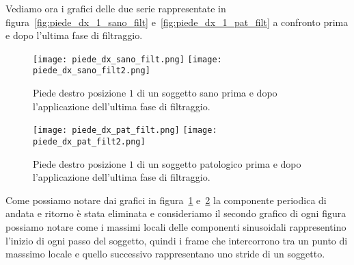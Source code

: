 Vediamo ora i grafici delle due serie rappresentate in figura~\ref{fig:piede_dx_1_sano_filt} 
e~\ref{fig:piede_dx_1_pat_filt} a confronto prima e dopo l'ultima fase di filtraggio.

\begin{figure}[H]
    \centering
    \texttt{[image: piede\_dx\_sano\_filt.png]}
    \texttt{[image: piede\_dx\_sano\_filt2.png]}
    \caption{Piede destro posizione $1$ di un soggetto sano prima e dopo l'applicazione dell'ultima fase di filtraggio.}
    \label{fig:piede_dx_1_sano_filt2}
\end{figure}
\begin{figure}[H]
    \centering
    \texttt{[image: piede\_dx\_pat\_filt.png]}
    \texttt{[image: piede\_dx\_pat\_filt2.png]}
    \caption{Piede destro posizione $1$ di un soggetto patologico prima e dopo l'applicazione dell'ultima fase di filtraggio.}
    \label{fig:piede_dx_1_pat_filt2}
\end{figure}

Come possiamo notare dai grafici in figura~\ref*{fig:piede_dx_1_sano_filt2} 
e~\ref*{fig:piede_dx_1_pat_filt2} la componente periodica di andata e ritorno 
è stata eliminata 
e consideriamo il secondo grafico di ogni figura possiamo notare come i massimi locali 
delle componenti sinusoidali rappresentino l'inizio di ogni passo del soggetto,
quindi i frame che intercorrono tra un punto di masssimo locale e quello successivo rappresentano
uno stride di un soggetto.